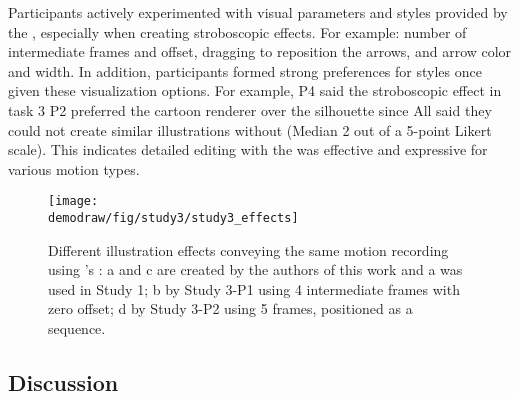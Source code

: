 %
%
Participants actively experimented with visual parameters and styles provided by the \phaseII{}, especially when creating stroboscopic effects. For example: number of intermediate frames and offset, dragging to reposition the arrows, and arrow color and width.
%
In addition, participants formed strong preferences for styles once given these visualization options. For example, P4 said the stroboscopic effect in task 3  P2 preferred the cartoon renderer over the silhouette since 
%
All said they could not create similar illustrations without \systemname{} (Median 2 out of a 5-point Likert scale).
%
This indicates  detailed editing with the \phaseII{} was effective and expressive for various motion types.

\begin{figure}[t]
  \centering
  \texttt{[image: \\demodraw/fig/study3/study3\_effects]}
  \caption{Different illustration effects conveying the same motion recording using \systemname{}'s \phaseII{}: a and c are created by the authors of this work and a was used in Study 1; b by Study 3-P1 using 4 intermediate frames with zero offset; d by Study 3-P2 using 5 frames, positioned as a sequence.}
  \label{fig:study3_effects}
\end{figure}

\subsection {Discussion}

